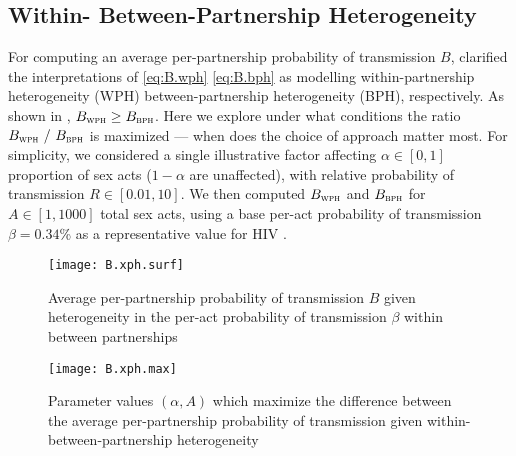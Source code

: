 \subsection{Within- \vs Between-Partnership Heterogeneity}\label{foi.exp.xph}
For computing an average per-partnership probability of transmission $B$,
 clarified the interpretations of
\eqref{eq:B.wph} \vs \eqref{eq:B.bph} as modelling
within-partnership heterogeneity (WPH) \vs between-partnership heterogeneity (BPH), respectively.
As shown in , $B_{\textsc{wph}} \ge B_{\textsc{bph}}$.
Here we explore under what conditions the ratio $B_{\textsc{wph}}~/~B_{\textsc{bph}}$ is maximized
--- \ie when does the choice of approach matter most.
For simplicity, we considered a single illustrative factor
affecting $\alpha \in [0,1]$ proportion of sex acts ($1-\alpha$ are unaffected),
with relative probability of transmission $R \in [0.01,10]$.
We then computed $B_{\textsc{wph}}$ and $B_{\textsc{bph}}$ for $A \in [1,1000]$ total sex acts,
using a base per-act probability of transmission $\beta = 0.34$\%
as a representative value for HIV \cite{Boily2009}.
\par
\begin{figure}
  \centering\texttt{[image: B.xph.surf]}
  \caption{Average per-partnership probability of transmission $B$
    given heterogeneity in the per-act probability of transmission $\beta$
    within \vs between partnerships}
  \label{fig:B.xph.surf}
\end{figure}
\begin{figure}
  \centering\texttt{[image: B.xph.max]}
  \caption{Parameter values $(\alpha,A)$ which maximize the difference between
    the average per-partnership probability of transmission
    given within- \vs between-partnership heterogeneity}
  \label{fig:B.xph.max}
\end{figure}
